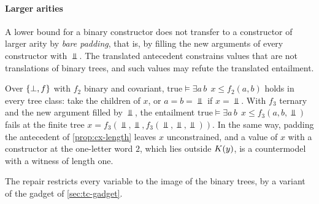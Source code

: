 \paragraph{Larger arities}
A lower bound for a binary constructor does not transfer to a constructor of
larger arity by \emph{bare padding}, that is, by filling the new arguments of
every constructor with $\Bot$. The translated antecedent constrains values that
are not translations of binary trees, and such values may refute the
translated entailment.

\begin{example}\label{ex:cx-padding}
Over $\{\bot,f\}$ with $f_2$ binary and covariant,
$\mathrm{true}\models\exists a\,b\ \ x\le f_2(a,b)$ holds in every tree class:
take the children of $x$, or $a=b=\Bot$ if $x=\Bot$. With $f_3$ ternary and the
new argument filled by $\Bot$, the entailment
$\mathrm{true}\models\exists a\,b\ \ x\le f_3(a,b,\Bot)$ fails at the finite tree
$x=f_3(\Bot,\Bot,f_3(\Bot,\Bot,\Bot))$. In the same way, padding the antecedent
of \cref{prop:cx-length} leaves $x$ unconstrained, and a value of $x$ with a
constructor at the one-letter word $2$, which lies outside $K(y)$, is a
countermodel with a witness of length one.
\end{example}

The repair restricts every variable to the image of the binary trees, by a
variant of the gadget of \cref{sec:tc-gadget}.

